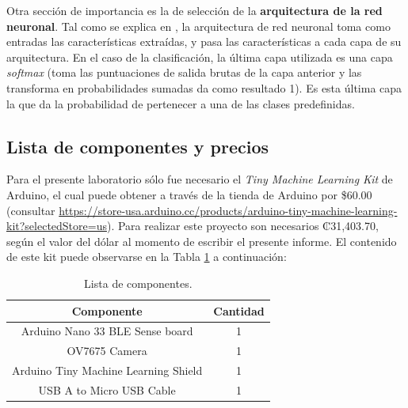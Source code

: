Otra sección de importancia es la de selección de la \textbf{arquitectura de la red neuronal}. Tal como se explica en \cite{EIP}, la arquitectura de red neuronal toma como entradas las características extraídas, y pasa las características a cada capa de su arquitectura. En el caso de la clasificación, la última capa utilizada es una capa \textit{softmax} (toma las puntuaciones de salida brutas de la capa anterior y las transforma en probabilidades sumadas da como resultado 1). Es esta última capa la que da la probabilidad de pertenecer a una de las clases predefinidas.

\subsection{Lista de componentes y precios}

Para el presente laboratorio sólo fue necesario el \textit{Tiny Machine Learning Kit} de Arduino, el cual puede obtener a través de la tienda de Arduino por \$60.00 (consultar \url{https://store-usa.arduino.cc/products/arduino-tiny-machine-learning-kit?selectedStore=us}). Para realizar este proyecto son necesarios ₡31,403.70, según el valor del dólar al momento de escribir el presente informe. El contenido de este kit puede observarse en la Tabla \ref{table:Equipo} a continuación:  

\begin{table}[H]
\caption{Lista de componentes.}
\begin{center}
\begin{tabular}{c|c}
\hline
\textbf{Componente}&\textbf{Cantidad}\\
\hline
Arduino Nano 33 BLE Sense board & 1 \\
OV7675 Camera & 1 \\
Arduino Tiny Machine Learning Shield & 1 \\
USB A to Micro USB Cable & 1 \\
\hline
\end{tabular} \label{table:Equipo}
\end{center}
\end{table}